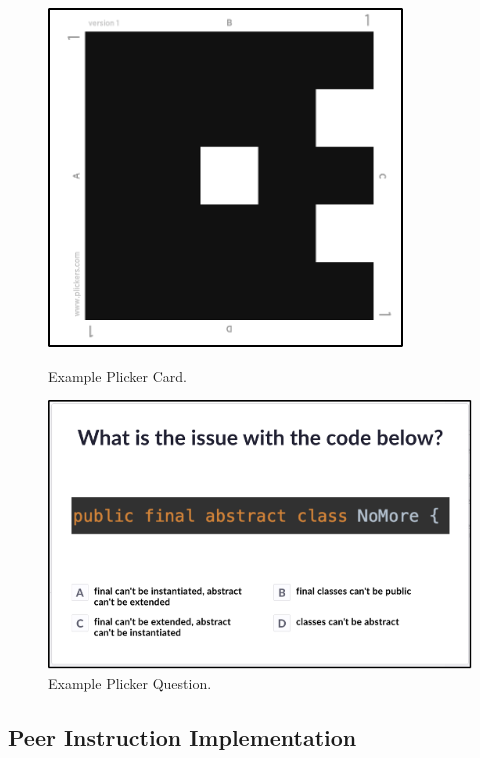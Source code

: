 \documentclass{article}
\begin{document}
\begin{figure}[ht]
  \centering
  \includegraphics[width=\linewidth]{plicker_card.png}
  \caption{Example Plicker Card.}
  \label{fig:plicker_card}
  \includegraphics[width=\linewidth]{plicker_question.png}
  \caption{Example Plicker Question.}
  \label{fig:plicker_question}
\end{figure}

\subsection{Peer Instruction Implementation}
\end{document}

